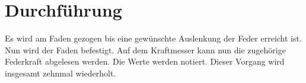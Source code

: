 \section{Durchführung}
\label{sec:Durchführung}

Es wird am Faden gezogen bis eine gewünschte Auslenkung der Feder erreicht ist. Nun wird der Faden befestigt. 
Auf dem Kraftmesser kann nun die zugehörige Federkraft abgelesen werden. 
Die Werte werden notiert. Dieser Vorgang wird insgesamt zehnmal wiederholt.
